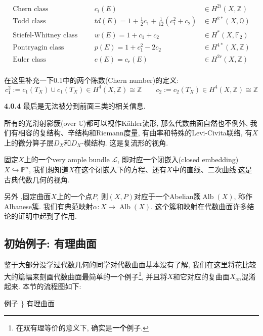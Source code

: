 \documentclass[UTF8,12pt,twoside]{article}
\theoremstyle{definition}
\newcommand{\ZZ}{\mathbb{Z}}  %
\newcommand{\QQ}{\mathbb{Q}}  %
\newcommand{\CC}{\mathbb{C}}  %
\newcommand{\Alb}{\operatorname{Alb}}
\numberwithin{equation}{section}
\begin{document}
\begin{equation*}
\begin{aligned}
\text{Chern class}& & & c_i(E) & \in H^{2i}(X,\ZZ) \\
\text{Todd class}& & &td(E)=1+\frac{1}{2}c_1+\frac{1}{12}(c_1^2+c_2) & \in H^{2*}(X,\QQ) \\
\text{Stiefel-Whitney class}& & &w(E)=1+c_1+c_2 & \in H^{*}(X,\mathbb{F}_2) \\
\text{Pontryagin class}& & &p(E)=1+c_1^2-2c_2 & \in H^{4*}(X,\ZZ) \\
\text{Euler class}& & &e(E)=c_r(E) & \in H^{2r}(X,\ZZ) \\
\end{aligned}
\end{equation*}

在这里补充一下0.1中的两个陈数(Chern number)的定义: 
$$c_1^2:=c_1(T_X) \cup c_1(T_X) \in H^4(X,\ZZ) \cong \ZZ \qquad c_2:=c_2(T_X) \in H^4(X,\ZZ) \cong \ZZ$$

\textbf{4.0.4} 最后是无法被分到前面三类的相关信息.

所有的光滑射影簇(over $\CC$)都可以视作Kähler流形, 那么代数曲面自然也不例外, 我们有相容的复结构、辛结构和Riemann度量, 有曲率和特殊的Levi-Civita联络, 有$X$上的微分算子层$D_X$和$D_X$-模结构. 这是复流形的视角.

固定$X$上的一个very ample bundle $\mathcal{L}$, 即对应一个闭嵌入(closed embedding)$X \hookrightarrow \mathbb{P}^n$, 我们想知道$X$在这个闭嵌入下的方程、还有$X$中的直线、二次曲线.这是古典代数几何的视角.

另外 ,固定曲面$X$上的一个点$P$, 则$(X,P)$对应于一个Abelian簇$\Alb(X)$, 称作Albanese簇. 我们有典范映射$\alpha:X \longrightarrow \Alb(X)$. 这个簇和映射在代数曲面许多结论的证明中起到了作用.

\subsection{初始例子: 有理曲面}

鉴于大部分没学过代数几何的同学对代数曲面基本没有了解, 我们在这里将花比较大的篇幅来刻画代数曲面最简单的一个例子\footnote{在双有理等价的意义下, 确实是\textbf{一个}例子.}, 并且将$X$和它对应的复曲面$X_{an}$混淆起来. 本节的流程图如下: 



例子\quad {}  \textcolor[RGB]{102,102,102}{ {\Big\}} 有理曲面}
\end{document}

